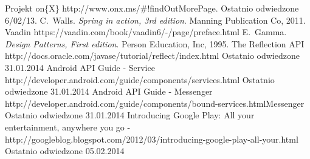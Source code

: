 \documentclass[11pt,a4paper,polish,thesis]{dcsbook}
\begin{document}
\backmatter

\begin{thebibliography}{1}
Projekt on\{X\} http://www.onx.ms/\#!findOutMorePage. Ostatnio odwiedzone 6/02/13.
C.~Walls. \emph{Spring in action, 3rd edition}. Manning Publication Co, 2011.
Vaadin https://vaadin.com/book/vaadin6/-/page/preface.html 
E.~Gamma. \emph{Design Patterns, First edition}. Person Education, Inc, 1995.
The Reflection API  http://docs.oracle.com/javase/tutorial/reflect/index.html Ostatnio odwiedzone 31.01.2014
 Android API Guide - Service http://developer.android.com/guide/components/services.html Ostatnio odwiedzone 31.01.2014
 Android API Guide - Messenger http://developer.android.com/guide/components/bound-services.htmlMessenger  Ostatnio odwiedzone 31.01.2014 
Introducing Google Play: All your entertainment, anywhere you go - http://googleblog.blogspot.com/2012/03/introducing-google-play-all-your.html Ostatnio odwiedzone 05.02.2014
\end{thebibliography}
\end{document}
